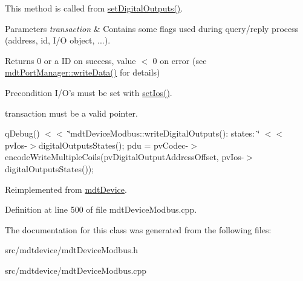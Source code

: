 This method is called from \hyperlink{classmdt_device_ae68a400d5f27fe142d41b674f473bf98}{setDigitalOutputs()}.


\begin{DoxyParams}{Parameters}
{\em transaction} & Contains some flags used during query/reply process (address, id, I/O object, ...). \\
\hline
\end{DoxyParams}
\begin{DoxyReturn}{Returns}
0 or a ID on success, value $<$ 0 on error (see \hyperlink{classmdt_port_manager_a8b60d53d6e553f15dedec916f9c1614b}{mdtPortManager::writeData()} for details) 
\end{DoxyReturn}
\begin{DoxyPrecond}{Precondition}
I/O's must be set with \hyperlink{classmdt_device_a9f1de62ef54974b0636dee673bd819e2}{setIos()}. 

transaction must be a valid pointer. 
\end{DoxyPrecond}


qDebug() $<$$<$ \char`\"{}mdtDeviceModbus::writeDigitalOutputs(): states: \char`\"{} $<$$<$ pvIos-\/$>$digitalOutputsStates(); pdu = pvCodec-\/$>$encodeWriteMultipleCoils(pvDigitalOutputAddressOffset, pvIos-\/$>$digitalOutputsStates()); 



Reimplemented from \hyperlink{classmdt_device_aa9e8ae7b4ff2455b4105d280d8523fc1}{mdtDevice}.



Definition at line 500 of file mdtDeviceModbus.cpp.



The documentation for this class was generated from the following files:\begin{DoxyCompactItemize}
\item 
src/mdtdevice/mdtDeviceModbus.h\item 
src/mdtdevice/mdtDeviceModbus.cpp\end{DoxyCompactItemize}
